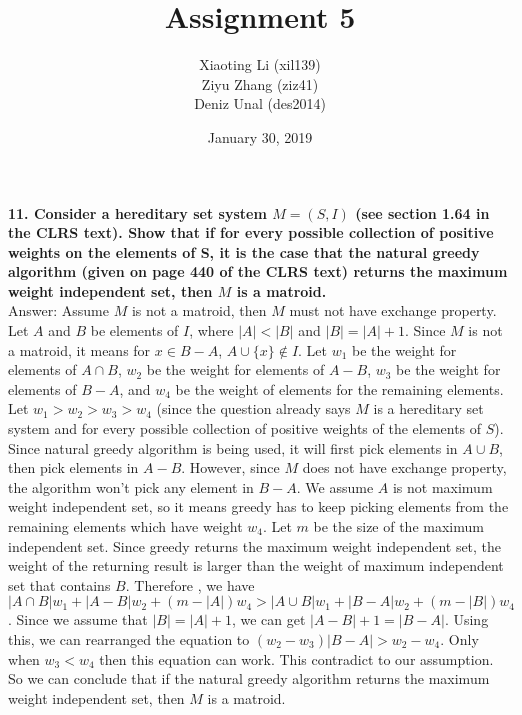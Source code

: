 \documentclass{article}
\title{Assignment 5}
\author{Xiaoting Li (xil139) \\
Ziyu Zhang (ziz41) \\
Deniz Unal (des2014)}
\date{January 30, 2019}
\begin{document}
\maketitle

\noindent
\textbf{11. Consider a hereditary set system $M = (S, I)$ (see section 1.64 in the CLRS text). Show that if for every possible collection of positive weights on the elements of S, it is the case that the natural greedy algorithm (given on page 440 of the CLRS text) returns the maximum weight independent set, then $M$ is a matroid.} \\ \newline
\noindent
Answer:
Assume $M$ is not a matroid, then $M$ must not have exchange property. Let $A$ and $B$ be elements of $I$, where $|A| < |B|$ and $|B| = |A| + 1$. Since $M$ is not a matroid, it means for $x \in B - A$, $A \cup \{x\} \notin I$. Let $w_1$ be the weight for elements of $A \cap B$, $w_2$ be the weight for elements of $A - B$, $w_3$ be the weight for elements of $B - A$, and $w_4$ be the weight of elements for the remaining elements. Let $w_1 > w_2 > w_3 > w_4$ (since the question already says $M$ is a hereditary set system and for every possible collection of positive weights of the elements of $S$). \\ \newline
\noindent
Since natural greedy algorithm is being used, it will first pick elements in $A \cup B$, then pick elements in $A - B$. However, since $M$ does not have exchange property, the algorithm won't pick any element in $B - A$. We assume $A$ is not maximum weight independent set, so it means greedy has to keep picking elements from the remaining elements which have weight $w_4$. Let $m$ be the size of the maximum independent set. Since greedy returns the maximum weight independent set, the weight of the returning result is larger than the weight of maximum independent set that contains $B$. Therefore , we have $|A \cap B|w_1 + |A - B|w_2 + (m - |A|)w_4 > |A \cup B|w_1 + |B - A|w_2 + (m - |B|)w_4$. Since we assume that $|B| = |A| + 1$, we can get $|A - B| + 1 = |B - A|$. Using this, we can rearranged the equation to $(w_2 - w_3)|B - A| > w_2 - w_4$. Only when $w_3 < w_4$ then this equation can work. This contradict to our assumption. So we can conclude that if the natural greedy algorithm returns the maximum weight independent set, then $M$ is a matroid.
\end{document}
